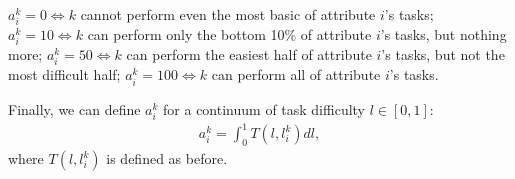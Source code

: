 \documentclass[hidelinks, nonatbib]{elsarticle}
\begin{document}
\begin{definition}[Skill]
        $a_{i}^{k} = 0 \iff k$ cannot perform even the most basic of attribute $i$'s tasks;
        $a_{i}^{k} = 10 \iff k$ can perform only the bottom 10\% of attribute $i$'s tasks, but nothing more;
        $a_{i}^{k} = 50 \iff k$ can perform the easiest half of attribute $i$'s tasks, but not the most difficult half;
        $a_{i}^{k} = 100 \iff k$ can perform all of attribute $i$'s tasks.
    

    Finally, we can define $a_{i}^{k}$ for a continuum of task difficulty $l \in [0,1]$:
    \begin{gather}
        a_{i}^{k} =
        \int_{0}^{1}{
        T(l, l_{i}^{k})
        dl
        }
        ,
    \end{gather}
    where $T(l, l_{i}^{k})$ is defined as before.
\end{definition}
\end{document}
